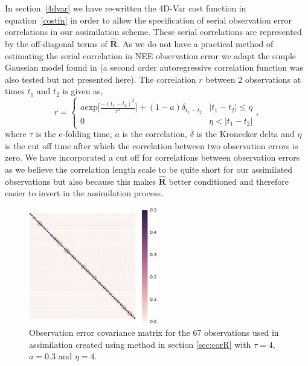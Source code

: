 \documentclass[11pt]{article}
\begin{document}
In section~\ref{4dvar} we have re-written the 4D-Var cost function in equation~\ref{costfn} in order to allow the specification of serial observation error correlations in our assimilation scheme. These serial correlations are represented by the off-diagonal terms of $\hat{\mathbf{R}}$. As we do not have a practical method of estimating the serial correlation in NEE observation error we adapt the simple Gaussian model found in \citet{jarvinen1999variational} (a second order autoregressive correlation function was also tested but not presented here). The correlation $r$ between 2 observations at times $t_1$ and $t_2$ is given as,
\begin{equation}
r =
\begin{cases} 
      a \text{exp} \bigg[ \frac{-(t_1 - t_2)^2}{\tau^2} \bigg] + (1- a)\delta_{t_1 - t_2} & |t_1 - t_2| \leq \eta \\
      0 & \eta < |t_1 - t_2| 
   \end{cases}
   , \label{eqn:corr_fn}
\end{equation}
where $\tau$ is the e-folding time, $a$ is the correlation, $\delta$ is the Kronecker delta and $\eta$ is the cut off time after which the correlation between two observation errors is zero. We have incorporated a cut off for correlations between observation errors as we believe the correlation length scale to be quite short for our assimilated observations but also because this makes $\hat{\mathbf{R}}$ better conditioned and therefore easier to invert in the assimilation process. 

\begin{figure}[ht]
    \centering
    \includegraphics[width=0.5\textwidth]{rcorb.eps}
    \caption{Observation error covariance matrix for the 67 observations used in assimilation created using method in section \ref{sec:corR} with $\tau = 4$, $a=0.3$ and $\eta=4$.}
    \label{fig:Rcorr}
\end{figure}
\end{document}
